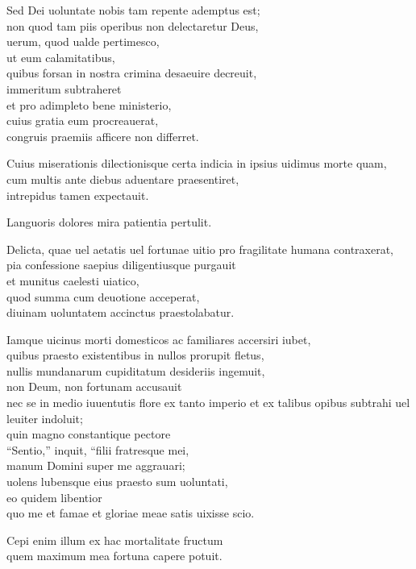 \documentclass[a5paper,twoside]{article}
\begin{document}
Sed Dei uoluntate nobis tam repente ademptus est; \\
non quod tam piis operibus non delectaretur Deus, \\
uerum, quod ualde pertimesco, \\
ut eum calamitatibus, \\
quibus forsan in nostra crimina desaeuire decreuit, \\
immeritum subtraheret \\
et pro adimpleto bene ministerio, \\
cuius gratia eum procreauerat, \\
congruis praemiis afficere non differret.

Cuius miserationis dilectionisque certa indicia in ipsius uidimus morte quam, \\
cum multis ante diebus aduentare praesentiret, \\
intrepidus tamen expectauit.  

Languoris dolores mira patientia pertulit.   

Delicta, quae uel aetatis uel fortunae uitio pro fragilitate humana contraxerat, \\
pia confessione saepius diligentiusque purgauit \\
et munitus caelesti uiatico, \\
quod summa cum deuotione acceperat, \\
diuinam uoluntatem accinctus praestolabatur.  

Iamque uicinus morti domesticos ac familiares accersiri iubet, \\
quibus praesto existentibus in nullos prorupit fletus, \\
nullis mundanarum cupiditatum desideriis ingemuit, \\
non Deum, non fortunam accusauit \\
nec se in medio iuuentutis flore ex tanto imperio et ex talibus opibus subtrahi uel leuiter indoluit; \\
quin magno constantique pectore \\
``Sentio,'' inquit, ``filii fratresque mei, \\
manum Domini super me aggrauari; \\
uolens lubensque eius praesto sum uoluntati, \\
eo quidem libentior \\
quo me et famae et gloriae meae satis uixisse scio.  

Cepi enim illum ex hac mortalitate fructum \\
quem maximum mea fortuna capere potuit.   
\end{document}
